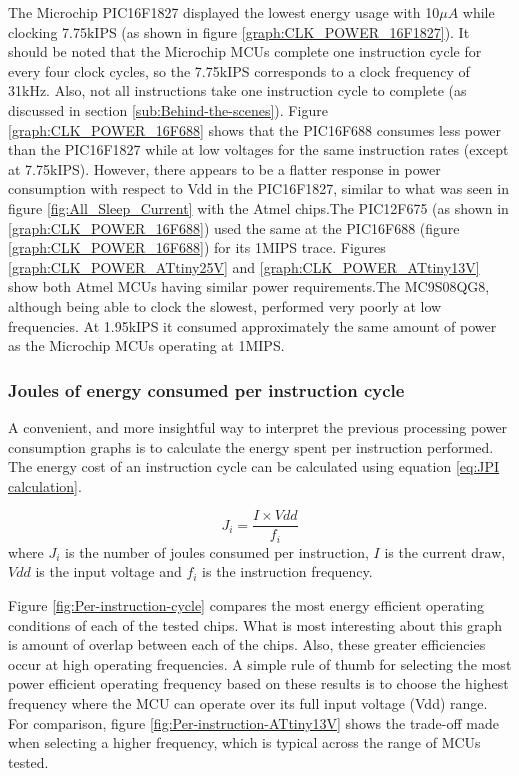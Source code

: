 The Microchip PIC16F1827 displayed the lowest energy usage with 10$\mu A$
while clocking 7.75kIPS (as shown in figure \ref{graph:CLK_POWER_16F1827}).
It should be noted that the Microchip MCUs complete one instruction
cycle for every four clock cycles, so the 7.75kIPS corresponds to
a clock frequency of 31kHz. Also, not all instructions take one instruction
cycle to complete (as discussed in section \ref{sub:Behind-the-scenes}).
Figure \ref{graph:CLK_POWER_16F688} shows that the PIC16F688 consumes
less power than the PIC16F1827 while at low voltages for the same
instruction rates (except at 7.75kIPS). However, there appears to
be a flatter response in power consumption with respect to Vdd in
the PIC16F1827, similar to what was seen in figure \ref{fig:All_Sleep_Current}
with the Atmel chips.The PIC12F675 (as shown in \ref{graph:CLK_POWER_16F688})
used the same at the PIC16F688 (figure \ref{graph:CLK_POWER_16F688})
for its 1MIPS trace. Figures \ref{graph:CLK_POWER_ATtiny25V} and
\ref{graph:CLK_POWER_ATtiny13V} show both Atmel MCUs having similar
power requirements.The MC9S08QG8, although being able to clock the
slowest, performed very poorly at low frequencies. At 1.95kIPS it
consumed approximately the same amount of power as the Microchip MCUs
operating at 1MIPS.


\subsubsection{Joules of energy consumed per instruction cycle\label{sub:Joules-of-energy}}

A convenient, and more insightful way to interpret the previous processing
power consumption graphs is to calculate the energy spent per instruction
performed. The energy cost of an instruction cycle can be calculated
using equation \ref{eq:JPI calculation}.

\begin{equation}
J_{i}=\frac{I\times Vdd}{f_{i}}\label{eq:JPI calculation}
\end{equation}
where $J_{i}$ is the number of joules consumed per instruction, $I$
is the current draw, $Vdd$ is the input voltage and $f_{i}$ is the
instruction frequency.

Figure \ref{fig:Per-instruction-cycle} compares the most energy efficient
operating conditions of each of the tested chips. What is most interesting
about this graph is amount of overlap between each of the chips. Also,
these greater efficiencies occur at high operating frequencies. A
simple rule of thumb for selecting the most power efficient operating
frequency based on these results is to choose the highest frequency
where the MCU can operate over its full input voltage (Vdd) range.
For comparison, figure \ref{fig:Per-instruction-ATtiny13V} shows
the trade-off made when selecting a higher frequency, which is typical
across the range of MCUs tested.

